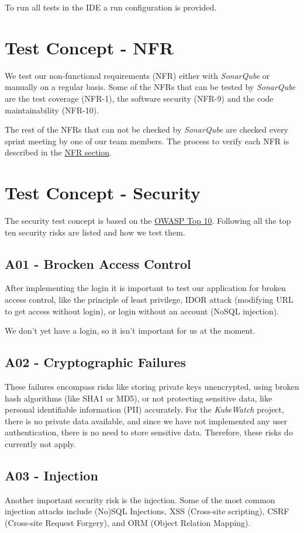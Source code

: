 To run all tests in the IDE a run configuration is provided.


\section{Test Concept - NFR}
We test our non-functional requirements (NFR) either with \textit{SonarQube} or manually on a regular basis. Some of the NFRs that can be tested by \textit{SonarQube} are the test coverage (NFR-1), the software security (NFR-9) and the code maintainability (NFR-10).

The rest of the NFRs that can not be checked by \textit{SonarQube} are checked every sprint meeting by one of our team members.
The process to verify each NFR is described in the \hyperref[section:non-functional-requirements]{NFR section}.

\section{Test Concept - Security}
The security test concept is based on the \href{https://owasp.org/www-project-top-ten/}{OWASP Top 10}.
Following all the top ten security risks are listed and how we test them.

\subsection{A01 - Brocken Access Control}
After implementing the login it is important to test our application for broken access control, like the principle of least privilege, IDOR attack (modifying URL to get access without login), or login without an account (NoSQL injection).

We don't yet have a login, so it isn't important for us at the moment.

\subsection{A02 - Cryptographic Failures}
These failures encompass risks like storing private keys unencrypted, using broken hash algorithms (like SHA1 or MD5), or not protecting sensitive data, like personal identifiable information (PII) accurately. For the \textit{KubeWatch} project, there is no private data available, and since we have not implemented any user authentication, there is no need to store sensitive data. Therefore, these risks do currently not apply.

\subsection{A03 - Injection}
Another important security risk is the injection. Some of the most common injection attacks include (No)SQL Injections, XSS (Cross-site scripting), CSRF (Cross-site Request Forgery), and ORM (Object Relation Mapping).


